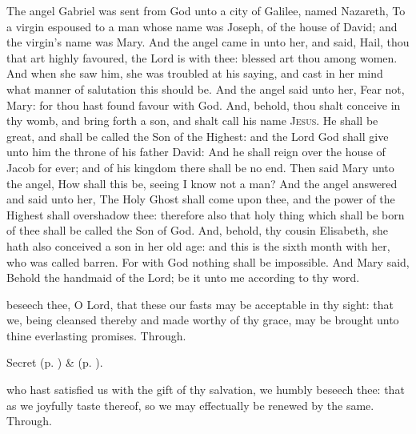  The angel Gabriel was sent from God unto a city of Galilee, named Nazareth, To a virgin espoused to a man whose name was Joseph, of the house of David; and the virgin's name was Mary. And the angel came in unto her, and said, Hail, thou that art highly favoured, the Lord is with thee: blessed art thou among women. And when she saw him, she was troubled at his saying, and cast in her mind what manner of salutation this should be. And the angel said unto her, Fear not, Mary: for thou hast found favour with God. And, behold, thou shalt conceive in thy womb, and bring forth a son, and shalt call his name \textsc{Jesus}. He shall be great, and shall be called the Son of the Highest: and the Lord God shall give unto him the throne of his father David: And he shall reign over the house of Jacob for ever; and of his kingdom there shall be no end. Then said Mary unto the angel, How shall this be, seeing I know not a man? And the angel answered and said unto her, The Holy Ghost shall come upon thee, and the power of the Highest shall overshadow thee: therefore also that holy thing which shall be born of thee shall be called the Son of God. And, behold, thy cousin Elisabeth, she hath also conceived a son in her old age: and this is the sixth month with her, who was called barren. For with God nothing shall be impossible. And Mary said, Behold the handmaid of the Lord; be it unto me according to thy word.


\secret
{} beseech thee, O Lord, that these our fasts may be acceptable in thy sight: that we, being cleansed thereby and made worthy of thy grace, may be brought unto thine everlasting promises. Through.

\begin{rubric}
     Secret  (p. \pageref{AdventISecret}) \&   (p. \pageref{SPMaryInAdvent}).
\end{rubric}


\postcommunion
{} who hast satisfied us with the gift of thy salvation, we humbly beseech thee: that as we joyfully taste thereof, so we may effectually be renewed by the same. Through.

